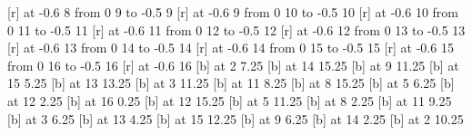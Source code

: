  [r] at -0.6 8
\putrule from 0 9 to -0.5 9
 [r] at -0.6 9
\putrule from 0 10 to -0.5 10
 [r] at -0.6 10
\putrule from 0 11 to -0.5 11
 [r] at -0.6 11
\putrule from 0 12 to -0.5 12
 [r] at -0.6 12
\putrule from 0 13 to -0.5 13
 [r] at -0.6 13
\putrule from 0 14 to -0.5 14
 [r] at -0.6 14
\putrule from 0 15 to -0.5 15
 [r] at -0.6 15
\putrule from 0 16 to -0.5 16
 [r] at -0.6 16
 [b] at 2 7.25
 [b] at 14 15.25
 [b] at 9 11.25
 [b] at 15 5.25
 [b] at 13 13.25
 [b] at 3 11.25
 [b] at 11 8.25
 [b] at 8 15.25
 [b] at 5 6.25
 [b] at 12 2.25
 [b] at 16 0.25
 [b] at 12 15.25
 [b] at 5 11.25
 [b] at 8 2.25
 [b] at 11 9.25
 [b] at 3 6.25
 [b] at 13 4.25
 [b] at 15 12.25
 [b] at 9 6.25
 [b] at 14 2.25
 [b] at 2 10.25
\endpicture
\vfil\eject\bye
